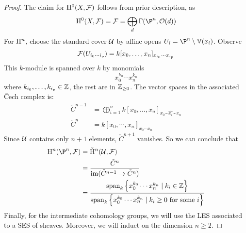 \documentclass{article}
\begin{document}
\lec

\begin{proof}
    The claim for \(\mathrm{H}^0(X, \mathcal{F})\) follows from prior description, as
    \[\HH^0(X, \mcF) = \mcF = \bigoplus_d \Gamma(\P^n, \mcO(d))\]
    For \(\mathrm{H}^n\), choose the standard cover \(\mathcal{U}\) by affine opens \(U_i = \P^n \setminus \van(x_i)\). Observe 
    \[\mathcal{F}(U_{i_0\cdots i_p}) = k[x_0, \dots, x_n]_{x_{i_0}\cdots x_{i_p}}\]
    This \(k\)-module is spanned over \(k\) by monomials
    \[x_0^{k_0}\cdots x_n^{k_n}\]
    where \(k_{i_0}, \dots, k_{i_p} \in \mathbb{Z}\), the rest are in \(\mathbb{Z}_{\ge 0}\). The vector spaces in the associated \v Cech complex is:
    \begin{align*}
        \check C^{n-1} &= \bigoplus_{i=1}^n k[x_0, \dots, x_n]_{x_0\cdots \widehat{x_i}\cdots x_n} \\
        \check C^n &= k[x_0, \cdots, x_n]_{x_0\cdots x_n}
    \end{align*}
    Since \(\mathcal{U}\) contains only \(n+1\) elements, \(\check C^{n+1}\) vanishes. So we can conclude that
    \begin{align*}
        \HH^n(\P^n, \mcF) &= \check \HH^n(\mcU, \mcF) \\
        &= \frac{\check C^n}{\im(\check C^{n-1} \to \check C^n)} \\
        &= \frac{\Span_k\left\{x_0^{k_0}\cdots x_n^{k_n} \mid k_i \in \Z\right\}}{\Span_k\left\{x_0^{k_0}\cdots x_n^{k_n} \mid k_i \ge 0 \text{ for some }i\right\}}
    \end{align*}
    Finally, for the intermediate cohomology groups, we will use the LES associated to a SES of sheaves. Moreover, we will induct on the dimension \(n \ge 2\).


\end{proof}
\end{document}
